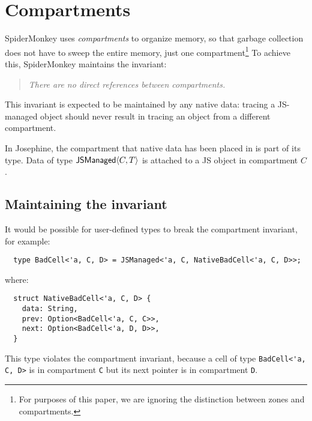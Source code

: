 \section{Compartments}

SpiderMonkey uses \emph{compartments} to organize memory,
so that garbage collection does not have to sweep the
entire memory, just one compartment\footnote{%
  For purposes of this paper, we are ignoring the distinction between zones and
  compartments.
}
To achieve this, SpiderMonkey maintains the invariant:
\begin{quote}\em
  There are no direct references between compartments.
\end{quote}
This invariant is expected to be maintained by
any native data: tracing a JS-managed object
should never result in tracing an object from a different
compartment.

In Josephine, the compartment that
native data has been placed in is part of its
type. Data of type $\mathsf{JSManaged}\langle C,T\rangle$ is attached
to a JS object in compartment $C$.

\subsection{Maintaining the invariant}

It would be possible for user-defined types to break
the compartment invariant, for example:
\begin{verbatim}
  type BadCell<'a, C, D> = JSManaged<'a, C, NativeBadCell<'a, C, D>>;
\end{verbatim}
where:
\begin{verbatim}
  struct NativeBadCell<'a, C, D> {
    data: String,
    prev: Option<BadCell<'a, C, C>>,
    next: Option<BadCell<'a, D, D>>,
  }
\end{verbatim}
This type violates the compartment invariant, because
a cell of type \verb|BadCell<'a, C, D>| is in compartment
\verb|C| but its next pointer is in compartment \verb|D|.

